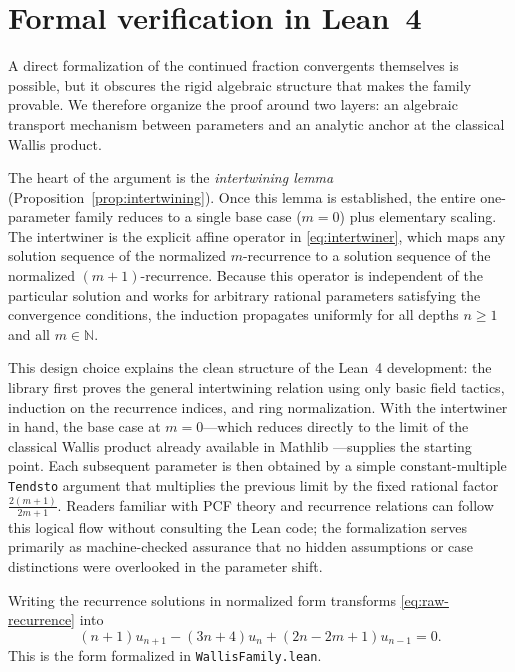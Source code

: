\documentclass[11pt,reqno]{amsart}
\newcommand{\N}{\mathbb{N}}
\newcommand{\WallisStep}[1]{\frac{2(#1+1)}{2#1+1}}
\theoremstyle{plain}
\theoremstyle{definition}
\theoremstyle{remark}
\begin{document}
\section{Formal verification in Lean~4}\label{sec:lean}

A direct formalization of the continued fraction convergents themselves is possible, but it obscures the rigid algebraic structure that makes the family provable.  We therefore organize the proof around two layers: an algebraic transport mechanism between parameters and an analytic anchor at the classical Wallis product.

The heart of the argument is the \emph{intertwining lemma} (Proposition~\ref{prop:intertwining}).  Once this lemma is established, the entire one-parameter family reduces to a single base case ($m=0$) plus elementary scaling.  The intertwiner is the explicit affine operator in \eqref{eq:intertwiner}, which maps any solution sequence of the normalized $m$-recurrence to a solution sequence of the normalized $(m+1)$-recurrence.  Because this operator is independent of the particular solution and works for arbitrary rational parameters satisfying the convergence conditions, the induction propagates uniformly for all depths $n \ge 1$ and all $m \in \N$.

This design choice explains the clean structure of the Lean~4 development: the library first proves the general intertwining relation using only basic field tactics, induction on the recurrence indices, and ring normalization.  With the intertwiner in hand, the base case at $m=0$---which reduces directly to the limit of the classical Wallis product already available in Mathlib \cite{mathlib2020,borwein1987pi}---supplies the starting point.  Each subsequent parameter is then obtained by a simple constant-multiple \texttt{Tendsto} argument that multiplies the previous limit by the fixed rational factor $\WallisStep{m}$.  Readers familiar with PCF theory and recurrence relations can follow this logical flow without consulting the Lean code; the formalization serves primarily as machine-checked assurance that no hidden assumptions or case distinctions were overlooked in the parameter shift.

Writing the recurrence solutions in normalized form transforms \eqref{eq:raw-recurrence} into
\begin{equation}\label{eq:normalized-recurrence}
  (n+1)u_{n+1} - (3n+4)u_n + (2n-2m+1)u_{n-1} = 0.
\end{equation}
This is the form formalized in \texttt{WallisFamily.lean}.
\end{document}
